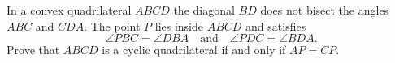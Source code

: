 In a convex quadrilateral $ABCD$ the diagonal $BD$ does not bisect the angles $ABC$ and $CDA$. The point $P$ lies inside $ABCD$ and satisfies
\[ \angle PBC = \angle DBA \quad \text{and} \quad \angle PDC = \angle BDA. \]
Prove that $ABCD$ is a cyclic quadrilateral if and only if $AP = CP$.
